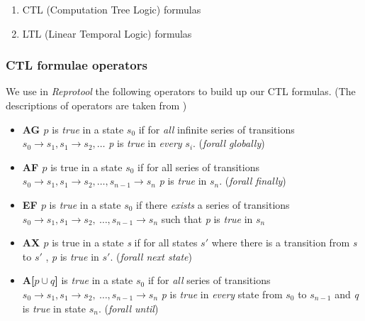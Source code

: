 \begin{enumerate}
 \item CTL (Computation Tree Logic) formulas
 \item LTL (Linear Temporal Logic) formulas
\end{enumerate}

\subsubsection{CTL formulae operators}
We use in \emph{Reprotool} the following operators to build up our CTL formulas. (The descriptions of operators are taken from
\cite{nusmv-manual}) 

\begin{itemize}
 \item \textbf{AG $p$} is \emph{true} in a state $s_{0}$ if for \emph{all} infinite series of transitions $s_{0} \rightarrow s_{1} , s_{1} \rightarrow 
  s_{2} , \ldots$ \emph{p} is \emph{true} in \emph{every} $s_{i}$. (\emph{forall globally})
 
 \item \textbf{AF $p$} is true in a state $s_{0}$ if for all series of transitions $s_{0} \rightarrow s_{1}, s_{1} \rightarrow
  s_{2},\ldots, s_{n-1} \rightarrow s_{n}$ \emph{p} is \emph{true} in $s_{n}$. (\emph{forall finally})

 \item \textbf{EF $p$} is \emph{true} in a state $s_{0}$ if there \emph{exists} a series of transitions $s_{0} \rightarrow s_{1}, 
 s_{1} \rightarrow s_{2},~\ldots, s_{n-1} \rightarrow s_{n}$ such that \emph{p} is \emph{true} in $s_{n}$
  
\item \textbf{AX $p$} is true in a state \emph{s} if for all states $s'$ where there is a transition from \emph{s} to
  $s'$ , \emph{p} is \emph{true} in $s'$. (\emph{forall next state})
  \item \textbf{A[$p \cup q$]} is \emph{true} in a state $s_{0}$ if for \emph{all} series of transitions $s_{0} \rightarrow s_{1},
  s_{1} \rightarrow s_{2},~\ldots, s_{n-1} \rightarrow s_{n}$ \emph{p} is \emph{true} in \emph{every} state from $s_{0}$ to
  $s_{n-1}$ and \emph{q} is \emph{true} in state $s_{n}$. (\emph{forall until})
\end{itemize}

